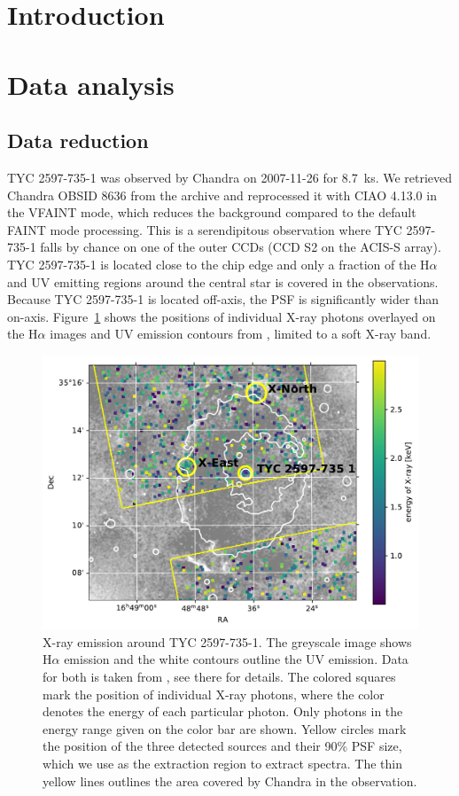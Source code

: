 \documentclass[linenumbers]{aastex631}
\begin{document}
\section{Introduction} \label{sec:intro}

\section{Data analysis} \label{sec:data}
\subsection{Data reduction}
TYC 2597-735-1 was observed by Chandra on 2007-11-26 for 8.7~ks. 
We retrieved Chandra OBSID 8636 from  the archive and reprocessed it with CIAO 4.13.0 \citep{2006SPIE.6270E..1VF} in the VFAINT mode, which reduces the background compared to the default FAINT mode processing. This is a serendipitous observation where TYC 2597-735-1 falls by chance on one of the outer CCDs (CCD S2 on the ACIS-S array). TYC 2597-735-1 is located close to the chip edge and only a fraction of the H$\alpha$ and UV emitting regions around the central star is covered in the observations. Because TYC 2597-735-1 is located off-axis, the PSF is significantly wider than on-axis. Figure~\ref{fig:chandraimage} shows the positions of individual X-ray photons overlayed on the H$\alpha$ images and UV emission contours from \citet{2020Natur.587..387H}, limited to a soft X-ray band. 
\begin{figure}
    \centering
    \includegraphics[width=\textwidth]{figures/chandraimage.pdf}
    \caption{X-ray emission around TYC 2597-735-1. The greyscale image shows H$\alpha$ emission and the white contours outline the UV emission. Data for both is taken from \citet{2020Natur.587..387H}, see there for details. The colored squares mark the position of individual X-ray photons, where the color denotes the energy of each particular photon. Only photons in the energy range given on the color bar are shown. Yellow circles mark the position of the three detected sources and their 90\% PSF size, which we use as the extraction region to extract spectra. The thin yellow lines outlines the area covered by Chandra in the observation.}
    \label{fig:chandraimage}
\end{figure}
\end{document}
